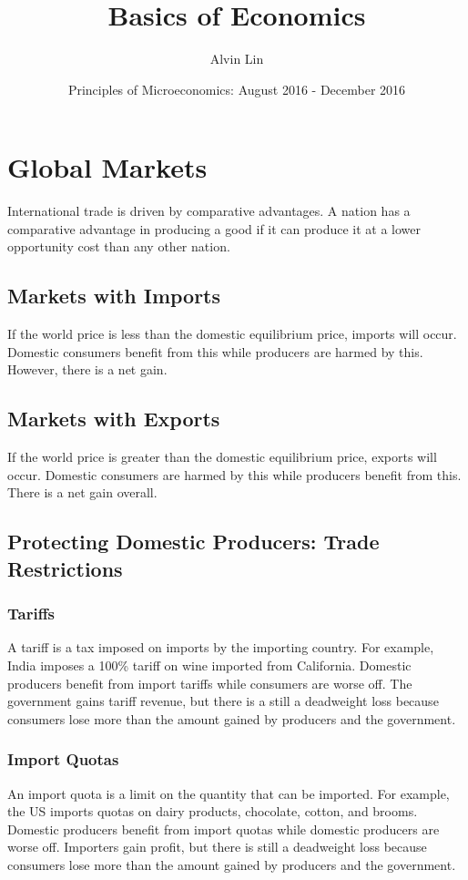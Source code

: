 \documentclass{article}
\title{Basics of Economics}
\author{Alvin Lin}
\date{Principles of Microeconomics: August 2016 - December 2016}
\begin{document}
\maketitle

\section{Global Markets}
International trade is driven by comparative advantages. A nation has a
comparative advantage in producing a good if it can produce it at a lower
opportunity cost than any other nation.

\subsection{Markets with Imports}
If the world price is less than the domestic equilibrium price, imports will
occur. Domestic consumers benefit from this while producers are harmed by this.
However, there is a net gain.

\subsection{Markets with Exports}
If the world price is greater than the domestic equilibrium price, exports will
occur. Domestic consumers are harmed by this while producers benefit from this.
There is a net gain overall.

\subsection{Protecting Domestic Producers: Trade Restrictions}

\subsubsection{Tariffs}
A tariff is a tax imposed on imports by the importing country. For example,
India imposes a 100\% tariff on wine imported from California. Domestic
producers benefit from import tariffs while consumers are worse off. The
government gains tariff revenue, but there is a still a deadweight loss
because consumers lose more than the amount gained by producers and the
government.

\subsubsection{Import Quotas}
An import quota is a limit on the quantity that can be imported. For example,
the US imports quotas on dairy products, chocolate, cotton, and brooms.
Domestic producers benefit from import quotas while domestic producers are
worse off. Importers gain profit, but there is still a deadweight loss because
consumers lose more than the amount gained by producers and the government.
\end{document}
